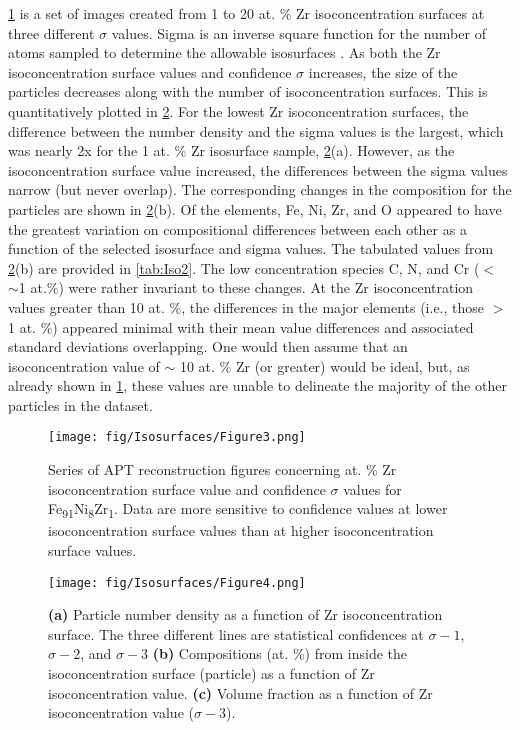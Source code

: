 		\ref{fig:Iso3} is a set of images created from 1 to 20 at. \% Zr isoconcentration surfaces at three different $\sigma${} values. Sigma is an inverse square function for the number of atoms sampled to determine the allowable isosurfaces \cite{RN1009}. As both the Zr isoconcentration surface values and confidence $\sigma${} increases, the size of the particles decreases along with the number of isoconcentration surfaces. This is quantitatively plotted in \ref{fig:Iso4}. For the lowest Zr isoconcentration surfaces, the difference between the number density and the sigma values is the largest, which was nearly 2x for the 1 at. \% Zr isosurface sample, \ref{fig:Iso4}(a). However, as the isoconcentration surface value increased, the differences between the sigma values narrow (but never overlap). The corresponding changes in the composition for the particles are shown in \ref{fig:Iso4}(b). Of the elements, Fe, Ni, Zr, and O appeared to have the greatest variation on compositional differences between each other as a function of the selected isosurface and sigma values. The tabulated values from \ref{fig:Iso4}(b) are provided in \ref{tab:Iso2}. The low concentration species C, N, and Cr ($<$ $\sim$1 at.\%) were rather invariant to these changes. At the Zr isoconcentration values greater than 10 at. \%, the differences in the major elements (i.e., those $>$ 1 at. \%) appeared minimal with their mean value differences and associated standard deviations overlapping. One would then assume that an isoconcentration value of $\sim$ 10 at. \% Zr (or greater) would be ideal, but, as already shown in \ref{fig:Iso3}, these values are unable to delineate the majority of the other particles in the dataset. 

		\begin{figure}
			\centering
			\texttt{[image: fig/Isosurfaces/Figure3.png]}
			\caption[Series of APT reconstruction figures concerning at. \% Zr isoconcentration surface value and confidence $\sigma${} values for Fe\textsubscript{91}Ni\textsubscript{8}Zr\textsubscript{1}.]{Series of APT reconstruction figures concerning at. \% Zr isoconcentration surface value and confidence $\sigma${} values for Fe\textsubscript{91}Ni\textsubscript{8}Zr\textsubscript{1}. Data are more sensitive to confidence values at lower isoconcentration surface values than at higher
				isoconcentration surface values.}
			\label{fig:Iso3}
		\end{figure}

		\begin{figure}
			\centering
			\texttt{[image: fig/Isosurfaces/Figure4.png]}
			\caption[Particle number density, concentration, and volume fraction as a function of Zr isoconcentration surface.]{\textbf{(a)} Particle number density as a function of Zr isoconcentration surface. The three different lines are statistical confidences at $\sigma-1${}, $\sigma-2${}, and $\sigma-3${} \textbf{(b)}
				Compositions (at. \%) from inside the isoconcentration surface (particle) as a function of Zr isoconcentration value. \textbf{(c)} Volume fraction as a function of Zr isoconcentration value ($\sigma-3${}).}
			\label{fig:Iso4}
		\end{figure}

